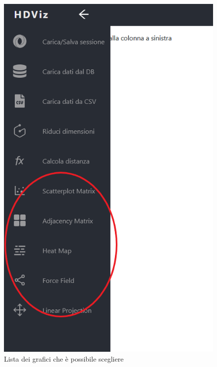 \begin{figure}[H]
		\includegraphics[scale=0.3]{Images/OptionList.png}
		\centering
		\caption{Lista dei grafici che è possibile scegliere}
\end{figure}

